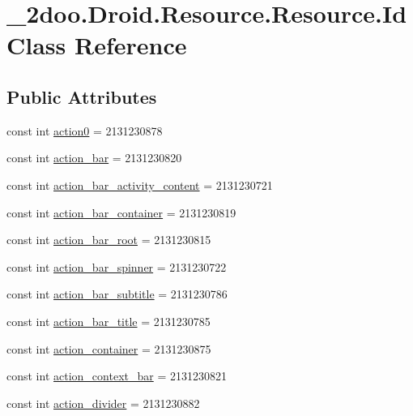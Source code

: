 \hypertarget{class__2doo_1_1_droid_1_1_resource_1_1_id}{
\section{\_\-2doo.Droid.Resource.Resource.Id Class Reference}
\label{class__2doo_1_1_droid_1_1_resource_1_1_id}
}
\subsection*{Public Attributes}
\begin{CompactItemize}
\item 
const int \hyperlink{class__2doo_1_1_droid_1_1_resource_1_1_id_1cd97586fad14d0a643013ed5e2a6ef9}{action0} = 2131230878
\item 
const int \hyperlink{class__2doo_1_1_droid_1_1_resource_1_1_id_05f35cd9ab7e24aae3f15c61a16a40a7}{action\_\-bar} = 2131230820
\item 
const int \hyperlink{class__2doo_1_1_droid_1_1_resource_1_1_id_3c025346d55ef44663cb1a3050f7ce70}{action\_\-bar\_\-activity\_\-content} = 2131230721
\item 
const int \hyperlink{class__2doo_1_1_droid_1_1_resource_1_1_id_3f108297798543a4d80fe71e49b90d3a}{action\_\-bar\_\-container} = 2131230819
\item 
const int \hyperlink{class__2doo_1_1_droid_1_1_resource_1_1_id_2ff5f736301c9fa85a499307977e4555}{action\_\-bar\_\-root} = 2131230815
\item 
const int \hyperlink{class__2doo_1_1_droid_1_1_resource_1_1_id_8b7987ba1e73d6fd4a3f1a03e3f329d6}{action\_\-bar\_\-spinner} = 2131230722
\item 
const int \hyperlink{class__2doo_1_1_droid_1_1_resource_1_1_id_86708596af2b89f4aa1741b3427fab27}{action\_\-bar\_\-subtitle} = 2131230786
\item 
const int \hyperlink{class__2doo_1_1_droid_1_1_resource_1_1_id_ea2e3e620aac1e88770b36469675a2bb}{action\_\-bar\_\-title} = 2131230785
\item 
const int \hyperlink{class__2doo_1_1_droid_1_1_resource_1_1_id_40655e33b27e9df27de8a25e731d6f3b}{action\_\-container} = 2131230875
\item 
const int \hyperlink{class__2doo_1_1_droid_1_1_resource_1_1_id_9720ad62e2090bf8a659865451f7a423}{action\_\-context\_\-bar} = 2131230821
\item 
const int \hyperlink{class__2doo_1_1_droid_1_1_resource_1_1_id_29d3a82271da09b6b0ad02ee3b3aa933}{action\_\-divider} = 2131230882

\end{CompactItemize}
